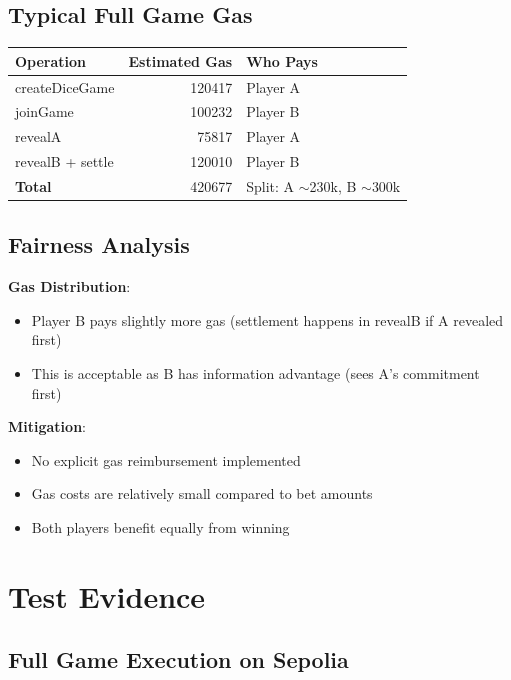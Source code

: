 \documentclass[10pt,a4paper]{article}
\begin{document}
\subsection*{Typical Full Game Gas}

\begin{table}[H]
\centering
\begin{tabularx}{\textwidth}{X r X}
\toprule
\textbf{Operation} & \textbf{Estimated Gas} & \textbf{Who Pays} \\
\midrule
createDiceGame & 120417 & Player A \\
joinGame & 100232 & Player B \\
revealA & 75817 & Player A \\
revealB + settle & 120010 & Player B \\
\textbf{Total} & 420677 & Split: A $\sim$230k, B $\sim$300k \\
\bottomrule
\end{tabularx}
\end{table}

\subsection*{Fairness Analysis}

\textbf{Gas Distribution}:
\begin{itemize}
    \item Player B pays slightly more gas (settlement happens in revealB if A revealed first)
    \item This is acceptable as B has information advantage (sees A's commitment first)
\end{itemize}

\textbf{Mitigation}:
\begin{itemize}
    \item No explicit gas reimbursement implemented
    \item Gas costs are relatively small compared to bet amounts
    \item Both players benefit equally from winning
\end{itemize}

\section{Test Evidence}

\subsection*{Full Game Execution on Sepolia}
\end{document}
